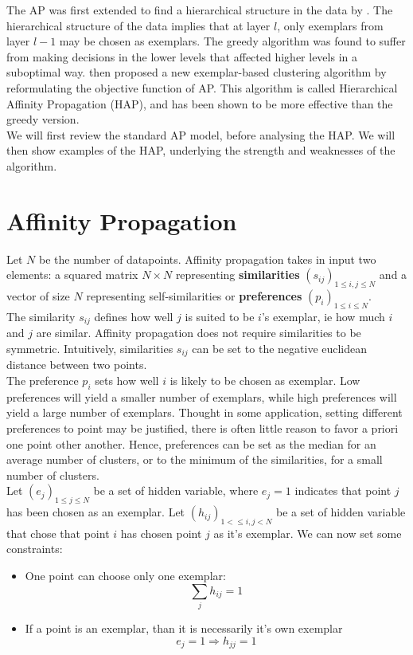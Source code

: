 \documentclass{ipol}
\begin{document}
The AP was first extended to find a hierarchical structure in the data by
\cite{Xiao07jointaffinity}. The hierarchical structure of the data implies
that at layer $l$, only exemplars from layer $l - 1$ may be chosen as
exemplars. The greedy algorithm was found to suffer from making decisions in
the lower levels that affected higher levels in a suboptimal way. \cite{hap}
then proposed a new exemplar-based clustering algorithm by reformulating the
objective function of AP. This algorithm is called Hierarchical Affinity
Propagation (HAP), and has been shown to be more effective than the greedy
version. \\

We will first review the standard AP model, before analysing the HAP. We will
then show examples of the HAP, underlying the strength and weaknesses of the
algorithm.

\section{Affinity Propagation}

Let $N$ be the number of datapoints. Affinity propagation takes in input two
elements: a squared matrix $N \times N$ representing \textbf{similarities}
$(s_{ij})_{1 \leq i, j \leq N}$ and
a vector of size $N$ representing self-similarities or \textbf{preferences}
$(p_i)_{1 \leq i \leq N}$. \\

The similarity $s_{ij}$ defines how well $j$ is suited to be $i$'s exemplar,
ie how much $i$ and $j$ are similar. Affinity propagation does not require
similarities to be symmetric. Intuitively, similarities $s_{ij}$ can be set to
the negative euclidean distance between two points. \\

The preference $p_i$ sets how well $i$ is likely to be chosen as exemplar. Low
preferences will yield a smaller number of exemplars, while high preferences
will yield a large number of exemplars. Thought in some application, setting
different preferences to point may be justified, there is often little reason
to favor a priori one point other another. Hence, preferences can be set as
the median for an average number of clusters, or to the minimum of the
similarities, for a small number of clusters. \\

Let $(e_j)_{1 \leq j \leq N}$ be a set of hidden variable, where $e_j = 1$ indicates that point
$j$ has been chosen as an exemplar. Let $(h_{ij})_{1 < \leq i, j < N}$ be a set of hidden variable
that chose that point $i$ has chosen point $j$ as it's exemplar. We can now
set some constraints:
\begin{itemize}
\item One point can choose only one exemplar:
\begin{equation*}
\sum_{j} h_{ij} = 1
\end{equation*}
\item If a point is an exemplar, than it is necessarily it's own exemplar
\begin{equation*}
e_{j} = 1 \Rightarrow h_{jj} = 1
\end{equation*}
\end{itemize}
\end{document}
